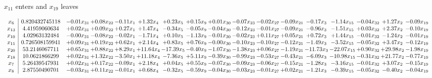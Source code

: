 \documentclass[9pt]{article}
\begin{document}
 $ x_{11} $ enters and $ x_{19} $ leaves 

 \[\begin{array}{c| c c@{\hskip 2pt} c@{\hskip 2pt} c@{\hskip 2pt} c@{\hskip 2pt} c@{\hskip 2pt} c@{\hskip 2pt} c@{\hskip 2pt} c@{\hskip 2pt} c@{\hskip 2pt} c@{\hskip 2pt} c@{\hskip 2pt} c@{\hskip 2pt} c@{\hskip 2pt} c@{\hskip 2pt} c@{\hskip 2pt} }
 x_{6}   &  0.820432745118 & -0.01 x_{31} & +  0.08 x_{22} & -0.11 x_{1} & +  1.32 x_{4} & +  0.23 x_{5} & +  0.15 x_{9} & +  0.01 x_{30} & -0.07 x_{23} & -0.02 x_{27} & -0.09 x_{21} & -0.17 x_{3} & -1.14 x_{15} & -0.04 x_{32} & +  1.27 x_{2} & -0.09 x_{19}\\
 x_{13}   &  4.41959060634 & +  0.02 x_{31} & +  0.09 x_{22} & +  0.27 x_{1} & +  1.47 x_{4} & -0.34 x_{5} & -0.05 x_{9} & -0.04 x_{30} & -0.12 x_{23} & -0.01 x_{27} & -0.09 x_{21} & -0.96 x_{3} & -1.51 x_{15} & +  0.03 x_{32} & +  2.37 x_{2} & -0.10 x_{19}\\
 x_{10}   &  4.02963132484 & -0.00 x_{31} & -0.08 x_{22} & -0.02 x_{1} & -1.71 x_{4} & +  0.10 x_{5} & -1.13 x_{9} & -0.01 x_{30} & -0.02 x_{23} & +  0.11 x_{27} & +  0.05 x_{21} & +  0.72 x_{3} & +  1.44 x_{15} & -0.01 x_{32} & -1.24 x_{2} & -0.01 x_{19}\\
 x_{11}   &  0.726508159941 & +  0.09 x_{31} & +  0.19 x_{22} & +  0.62 x_{1} & +  2.14 x_{4} & +  0.83 x_{5} & +  0.76 x_{9} & -0.00 x_{30} & -0.10 x_{23} & -0.10 x_{27} & -0.12 x_{21} & -1.49 x_{3} & -3.52 x_{15} & -0.05 x_{32} & +  3.47 x_{2} & -0.12 x_{19}\\
 x_{20}   &  53.2146067711 & +  0.65 x_{31} & +  0.88 x_{22} & +  8.29 x_{1} & + 11.64 x_{4} & -17.39 x_{5} & -0.40 x_{9} & -1.07 x_{30} & -1.38 x_{23} & +  0.06 x_{27} & -1.19 x_{21} & -11.73 x_{3} & -22.07 x_{15} & +  0.90 x_{32} & + 29.98 x_{2} & -1.98 x_{19}\\
 x_{18}   &  10.0621866299 & +  0.02 x_{31} & +  1.32 x_{22} & -3.50 x_{1} & + 11.18 x_{4} & -7.36 x_{5} & +  5.11 x_{9} & -0.39 x_{30} & -0.99 x_{23} & -0.53 x_{27} & -0.43 x_{21} & -6.09 x_{3} & -10.98 x_{15} & -0.31 x_{32} & + 21.77 x_{2} & -0.77 x_{19}\\
 x_{7}   &  5.26439547931 & +  0.02 x_{31} & +  0.17 x_{22} & -0.09 x_{1} & +  2.18 x_{4} & +  0.04 x_{5} & +  0.55 x_{9} & -0.07 x_{30} & -0.09 x_{23} & -0.06 x_{27} & -0.15 x_{21} & -1.28 x_{3} & -3.16 x_{15} & -0.01 x_{32} & +  3.07 x_{2} & -0.15 x_{19}\\
 x_{8}   &  2.87550490701 & -0.03 x_{31} & +  0.11 x_{22} & -0.01 x_{1} & +  0.68 x_{4} & -0.32 x_{5} & -0.59 x_{9} & -0.04 x_{30} & -0.03 x_{23} & -0.01 x_{27} & +  0.02 x_{21} & -1.21 x_{3} & -0.39 x_{15} & -0.05 x_{32} & -0.40 x_{2} & -0.04 x_{19}\\

\end{array}\]
\end{document}
